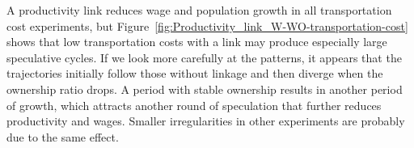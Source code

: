 A productivity link reduces wage and population growth in all transportation cost experiments,  but Figure~\ref{fig:Productivity_link_W-WO-transportation-cost} %
shows that low transportation costs with a link may produce especially large speculative cycles. %
If we look more carefully at the patterns, it appears that the trajectories initially follow those without linkage and then diverge when the ownership ratio drops. A period with stable ownership results in another period of growth, which attracts another round of speculation that further reduces productivity and wages. Smaller irregularities in other experiments are probably due to the same effect. 


\newpage
